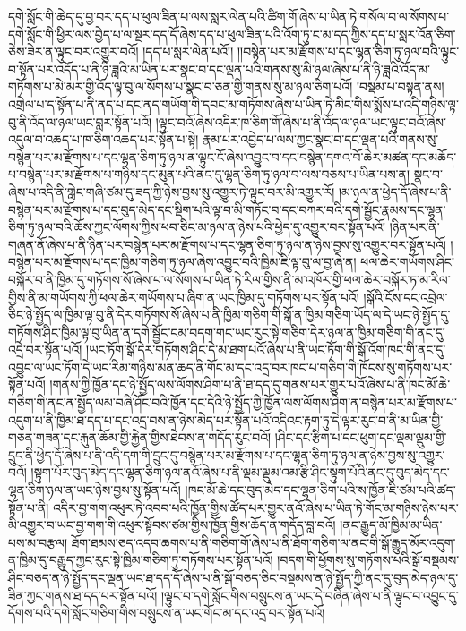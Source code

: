དགེ་སློང་གི་ཆེད་དུ་བྱ་བར་དད་པ་ཕུལ་ཟིན་པ་ལས་སླར་ལེན་པའི་ཚིག་གོ་ཞེས་པ་ཡིན་ཏེ་གསོལ་བ་ལ་སོགས་པ་དགེ་སློང་གི་ཕྱིར་ལས་བྱེད་པ་ལ་སྔར་དད་དོ་ཞེས་དད་པ་ཕུལ་ཟིན་པའི་འོག་ཏུ་ང་མ་དད་ཀྱིས་དད་པ་སླར་འོན་ཅིག་ཅེས་ཟེར་ན་ལྟུང་བར་འགྱུར་བའོ། །དད་པ་སླར་ལེན་པའོ།། །།བསྙེན་པར་མ་རྫོགས་པ་དང་ལྷན་ཅིག་ཏུ་ཉལ་བའི་ལྟུང་བ་སྟོན་པར་འདོད་པ་ནི་ཉི་ཟླའི་མ་ཡིན་པར་སྣང་བ་དང་ལྡན་པའི་གནས་སུ་མི་ཉལ་ཞེས་པ་ནི་ཉི་ཟླའི་འོད་མ་གཏོགས་པ་མེ་མར་གྱི་འོད་ལྟ་བུ་ལ་སོགས་པ་སྣང་བ་ཅན་གྱི་གནས་སུ་མ་ཉལ་ཅིག་པའོ། །བསྡམ་པ་བསྟན་ནས། འགྲེལ་པ་ད་སྟོན་པ་ནི་ནད་པ་དང་ནད་གཡོག་གི་དབང་མ་གཏོགས་ཞེས་པ་ཡིན་ཏེ་མིང་གིས་སྨོས་པ་འདི་གཉིས་ལྟ་བུ་ནི་འོད་ལ་ཉལ་ཡང་བླར་སྟོན་པའོ། །ལྟུང་བའོ་ཞེས་འདིར་ཁ་ཅིག་གོ་ཞེས་པ་ནི་འོད་ལ་ཉལ་ཡང་ལྟུང་བའོ་ཞེས་འདུལ་བ་འཆད་པ་ཁ་ཅིག་འཆད་པར་སྟོན་པ་སྟེ། རྣམ་པར་འབྱེད་པ་ལས་ཀྱང་སྣང་བ་དང་ལྡན་པའི་གནས་སུ་བསྙེན་པར་མ་རྫོགས་པ་དང་ལྷན་ཅིག་ཏུ་ཉལ་ན་ལྟུང་ངོ་ཞེས་འབྱུང་བ་དང་བསྙེན་དགའ་བོ་ཆེར་མཚན་དང་མཆོད་པ་བསྙེན་པར་མ་རྫོགས་པ་གཉིས་དང་མུན་པའི་ནང་དུ་ལྷན་ཅིག་ཏུ་ཉལ་བ་ལས་བཅས་པ་ཡིན་པས་ན། སྣང་བ་ཞེས་པ་འདི་ནི་གླེང་གཞི་ཙམ་དུ་ཟད་ཀྱི་ཉེས་བྱས་སུ་འགྱུར་ཏེ་ལྟུང་བར་མི་འགྱུར་རོ། །མ་ཉལ་ན་ཕྱེད་དོ་ཞེས་པ་ནི་བསྙེན་པར་མ་རྫོགས་པ་དང་བུད་མེད་དང་སྡིག་པའི་ལྟ་བ་མི་གཏོང་བ་དང་བཀར་བའི་དགེ་སྦྱོང་རྣམས་དང་ལྷན་ཅིག་ཏུ་ཉལ་བའི་ཆོས་ཀྱང་ལོགས་ཀྱིས་ཕབ་ཅིང་མ་ཉལ་ན་ཉེས་པའི་ཕྱེད་དུ་འགྱུར་བར་སྟོན་པའོ། །ཉིན་པར་ནི་གཞན་ནོ་ཞེས་པ་ནི་ཉིན་པར་བསྙེན་པར་མ་རྫོགས་པ་དང་ལྷན་ཅིག་ཏུ་ཉལ་ན་ཉེས་བྱས་སུ་འགྱུར་བར་སྟོན་པའོ། །བསྙེན་པར་མ་རྫོགས་པ་དང་ཁྱིམ་གཅིག་ཏུ་ཉལ་ཞེས་འབྱུང་བའི་ཁྱིམ་ཇི་ལྟ་བུ་ལ་བྱ་ཞེ་ན། ཕལ་ཆེར་གཡོགས་ཤིང་བསྐོར་བ་ནི་ཁྱིམ་དུ་གཏོགས་སོ་ཞེས་པ་ལ་སོགས་པ་ཡིན་ཏེ་རིལ་གྱིས་ནི་མ་འཁོར་གྱི་ཕལ་ཆེར་བསྐོར་ཏ་མ་རིལ་གྱིས་ནི་མ་གཡོགས་ཀྱི་ཕལ་ཆེར་གཡོགས་པ་ཞིག་ན་ཡང་ཁྱིམ་དུ་གཏོགས་པར་སྟོན་པའོ། །སྒོའི་ངོས་དང་འབྲེལ་ཅིང་ཉེ་སྤྱོད་ལ་ཁྱིམ་ལྟ་བུ་ནི་དེར་གཏོགས་སོ་ཞེས་པ་ནི་ཁྱིམ་གཅིག་གི་སྒོ་ན་ཁྱིམ་གཅིག་ཡོད་ལ་དེ་ཡང་ཉེ་སྤྱོད་དུ་གཏོགས་ཤིང་ཁྱིམ་ལྟ་བུ་ཡིན་ན་དགེ་སྦྱོང་ངམ་བདག་གང་ཡང་རུང་སྟེ་གཅིག་དེར་ཉལ་ན་ཁྱིམ་གཅིག་གི་ནང་དུ་འདྲེ་བར་སྟོན་པའོ། །ཡང་ཏོག་སྒོ་དེར་གཏོགས་ཤིང་དེ་མ་ཐག་པའོ་ཞེས་པ་ནི་ཡང་ཏོག་གི་སྒོ་འོག་ཁང་གི་ནང་དུ་འབྱུང་ལ་ཡང་ཏོག་དེ་ཡང་རིམ་གཉིས་མན་ཆད་ནི་གོང་མ་དང་འདྲ་བར་ཁང་པ་གཅིག་གི་ཁོངས་སུ་གཏོགས་པར་སྟོན་པའོ། །གནས་ཀྱི་ཁྱོན་དང་ཉེ་སྤྱོད་ལས་ལོགས་ཤིག་པ་ནི་ཐ་དད་དུ་གནས་པར་གྱུར་པའོ་ཞེས་པ་ནི་ཁང་མོ་ཆེ་གཅིག་གི་ནང་ན་སྤྱོད་ལམ་བཞི་ཤོང་བའི་ཁྱོན་དང་དེའི་ཉེ་སྤྱོད་ཀྱི་ཁྱོན་ལས་ལོགས་ཤིག་ན་བསྙེན་པར་མ་རྫོགས་པ་འདུག་པ་ནི་ཁྱིམ་ཐ་དད་པ་དང་འདྲ་བས་ན་ཉེས་མེད་པར་སྟོན་པའོ་འདིའང་རྟག་ཏུ་དེ་ལྟར་རུང་བ་ནི་མ་ཡིན་གྱི་གཅན་གཟན་དང་རྐུན་ཆོམ་གྱི་རྐྱེན་གྱིས་ཐེབས་ན་གདོད་རུང་བའོ། །ཤིང་དང་རྩིག་པ་དང་ཕུག་དང་ལྡམ་ལྡུམ་གྱི་དྲུང་ནི་ཕྱེད་དོ་ཞེས་པ་ནི་འདི་དག་གི་དྲུང་དུ་བསྙེན་པར་མ་རྫོགས་པ་དང་ལྷན་ཅིག་ཏུ་ཉལ་ན་ཉེས་བྱས་སུ་འགྱུར་བའོ། །སྟུག་པོར་བུད་མེད་དང་ལྷན་ཅིག་ཉལ་ནའོ་ཞེས་པ་ནི་ལྡམ་ལྡུམ་འམ་རྩི་ཤིང་སྟུག་པོའི་ནང་དུ་བུད་མེད་དང་ལྷན་ཅིག་ཉལ་ན་ཡང་ཉེས་བྱས་སུ་སྟོན་པའོ། །ཁང་མོ་ཆེ་དང་བུད་མེད་དང་ལྷན་ཅིག་པའི་ས་ཁྱོན་ཇི་ཙམ་པའི་ཚད་སྟོན་པ་ནི། འདིར་བྱ་གག་འཕུར་ཏེ་འབབ་པའི་ཁྱོན་གྱིས་ཚོད་པར་གྱུར་ནའོ་ཞེས་པ་ཡིན་ཏེ་གོང་མ་གཉིས་ཉེས་པར་མི་འགྱུར་བ་ཡང་བྱ་གག་གི་འཕུར་སྟོབས་ཙམ་གྱིས་ཁྱོན་གྱིས་ཆོད་ན་གདོད་བླ་བའོ། །ནང་རྒྱུད་མོ་ཁྱིམ་མ་ཡིན་པས་མ་བརྩལ། ཐོག་ཐམས་ཅད་འདབ་ཆགས་པ་ནི་གཅིག་གོ་ཞེས་པ་ནི་ཐོག་གཅིག་ལ་ནང་གི་སྒོ་རྒྱུད་མོར་འདུག་ན་ཁྱིམ་དུ་བརྒྱུད་ཀྱང་རུང་སྟེ་ཁྱིམ་གཅིག་ཏུ་གཏོགས་པར་སྟོན་པའོ། །བདག་གི་ཕྱོགས་སུ་གཏོགས་པའི་སྒོ་བསྡམས་ཤིང་བཅད་ན་ཉེ་སྤྱོད་དང་ལྡན་ཡང་ཐ་དད་དོ་ཞེས་པ་ནི་སྒོ་བཅད་ཅིང་བསྡམས་ན་ཉེ་སྤྱོད་ཀྱི་ནང་དུ་བུད་མེད་ཉལ་དུ་ཟིན་ཀྱང་གནས་ཐ་དད་པར་སྟོན་པའོ། །ལྟུང་བ་དགེ་སློང་གིས་བསྲུངས་ན་ཡང་དེ་བཞིན་ཞེས་པ་ནི་ལྟུང་བ་འབྱུང་དུ་དོགས་པའི་དགེ་སློང་གཅིག་གིས་བསྲུངས་ན་ཡང་གོང་མ་དང་འདྲ་བར་སྟོན་པའོ། 
